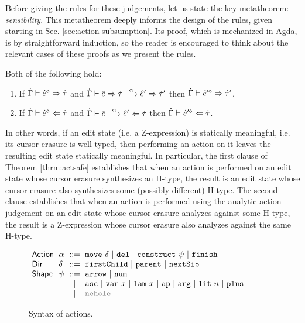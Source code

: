 Before giving the rules for these judgements, let us state the key metatheorem: \emph{sensibility}. This metatheorem deeply informs the design of the rules, given starting in Sec. \ref{sec:action-subsumption}. Its proof, which is mechanized in Agda, is by straightforward induction, so the reader is encouraged to think about the relevant cases of these proofs as we present the rules. 
\begin{theorem}\label{thrm:actsafe} Both of the following hold:\begin{enumerate}[itemsep=0px,partopsep=0px,topsep=0px]
\item If $\dot{\Gamma} \vdash \hat{e}^{\diamond} \Rightarrow \dot{\tau}$ and $\performSyn{\hGamma}{\zexp}{\htau}{\alpha}{\zexp'}{\htau'}$ 
   then
  $\dot{\Gamma} \vdash \hat{e}'^{\diamond} \Rightarrow \dot{\tau}'$.
\item If $\dot{\Gamma} \vdash \hat{e}^{\diamond} \Leftarrow \dot{\tau}$ and
   $\performAna{\hGamma}{\zexp}{\htau}{\alpha}{\zexp'}$ then
  $\dot{\Gamma} \vdash \hat{e}'^{\diamond} \Leftarrow \dot{\tau}$.
\end{enumerate}
\end{theorem}
\noindent In other words, if an edit state (i.e. a Z-expression) is statically meaningful, i.e. its cursor erasure is well-typed, then performing an action on it leaves the resulting edit state statically meaningful. In particular, the first clause of Theorem \ref{thrm:actsafe} establishes that when an action is performed on an edit state whose cursor erasure synthesizes an H-type, the result is an edit state whose cursor erasure also synthesizes some (possibly different) H-type. The second clause establishes that when an action is performed using the analytic action judgement on an edit state whose cursor erasure analyzes against some H-type, the result is a Z-expression whose cursor erasure also analyzes against the same H-type. %


\begin{figure}[t]
\hspace{-3px}$\arraycolsep=3pt\begin{array}{llcllll}
\mathsf{Action} & \alpha & ::= &
  \aMove{\delta} ~\vert~
  \aDel ~\vert~
  \aConstruct{\psi} ~\vert~
  \aFinish\\
\mathsf{Dir} & \delta & ::= &
  \dChild ~\vert~
  \dParent ~\vert~
  \dNext \\ %
\mathsf{Shape} & \psi & ::= &
  \farr ~\vert~
  \fnum \\
& & \vert &
  \fasc ~\vert~
  \fvar{x} ~\vert~
  \flam{x} ~\vert~
  \fap ~\vert~
  \farg ~\vert~
  \fnumlit{n} ~\vert~
  \fplus\\
& & \vert & 
  {\color{gray}\fnehole}
\end{array}$
\caption{Syntax of actions.}
\label{fig:action-syntax}
\end{figure}

